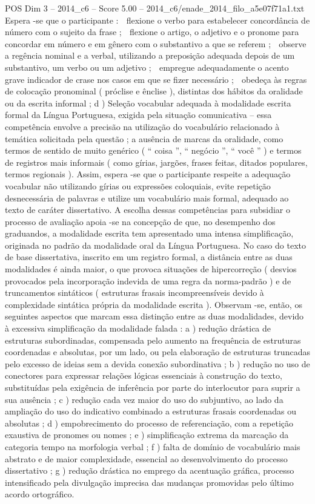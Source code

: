 \begin{textsample}{POS Dim 3 – 2014\_c6 – Score 5.00 – 2014\_c6/enade\_2014\_filo\_a5e07f71a1.txt}
Espera -se que o participante :  flexione o verbo para estabelecer concordância de número com o sujeito da frase ;  flexione o artigo, o adjetivo e o pronome para concordar em número e em gênero com o substantivo a que se referem ;  observe a regência nominal e a verbal, utilizando a preposição adequada depois de um substantivo, um verbo ou um adjetivo ;  empregue adequadamente o acento grave indicador de crase nos casos em que se fizer necessário ;  obedeça às regras de colocação pronominal ( próclise e ênclise ), distintas dos hábitos da oralidade ou da escrita informal ; d ) Seleção vocabular adequada à modalidade escrita formal da Língua Portuguesa, exigida pela situação comunicativa – essa competência envolve a precisão na utilização do vocabulário relacionado à temática solicitada pela questão ; a ausência de marcas da oralidade, como termos de sentido de muito genérico ( “ coisa ”, “ negócio ”, “ você ” ) e termos de registros mais informais ( como gírias, jargões, frases feitas, ditados populares, termos regionais ).
Assim, espera -se que o participante respeite a adequação vocabular não utilizando gírias ou expressões coloquiais, evite repetição desnecessária de palavras e utilize um vocabulário mais formal, adequado ao texto de caráter dissertativo.
A escolha dessas competências para subsidiar o processo de avaliação apoia -se na concepção de que, no desempenho dos graduandos, a modalidade escrita tem apresentado uma intensa simplificação, originada no padrão da modalidade oral da Língua Portuguesa.
No caso do texto de base dissertativa, inscrito em um registro formal, a distância entre as duas modalidades é ainda maior, o que provoca situações de hipercorreção ( desvios provocados pela incorporação indevida de uma regra da norma-padrão ) e de truncamentos sintáticos ( estruturas frasais incompreensíveis devido à complexidade sintática própria da modalidade escrita ).
Observam -se, então, os seguintes aspectos que marcam essa distinção entre as duas modalidades, devido à excessiva simplificação da modalidade falada : a ) redução drástica de estruturas subordinadas, compensada pelo aumento na frequência de estruturas coordenadas e absolutas, por um lado, ou pela elaboração de estruturas truncadas pelo excesso de ideias sem a devida conexão subordinativa ; b ) redução no uso de conectores para expressar relações lógicas essenciais à construção do texto, substituídas pela exigência de inferência por parte do interlocutor para suprir a sua ausência ; c ) redução cada vez maior do uso do subjuntivo, ao lado da ampliação do uso do indicativo combinado a estruturas frasais coordenadas ou absolutas ; d ) empobrecimento do processo de referenciação, com a repetição exaustiva de pronomes ou nomes ; e ) simplificação extrema da marcação da categoria tempo na morfologia verbal ; f ) falta de domínio de vocabulário mais abstrato e de maior complexidade, essencial ao desenvolvimento do processo dissertativo ; g ) redução drástica no emprego da acentuação gráfica, processo intensificado pela divulgação imprecisa das mudanças promovidas pelo último acordo ortográfico.

\end{textsample}
